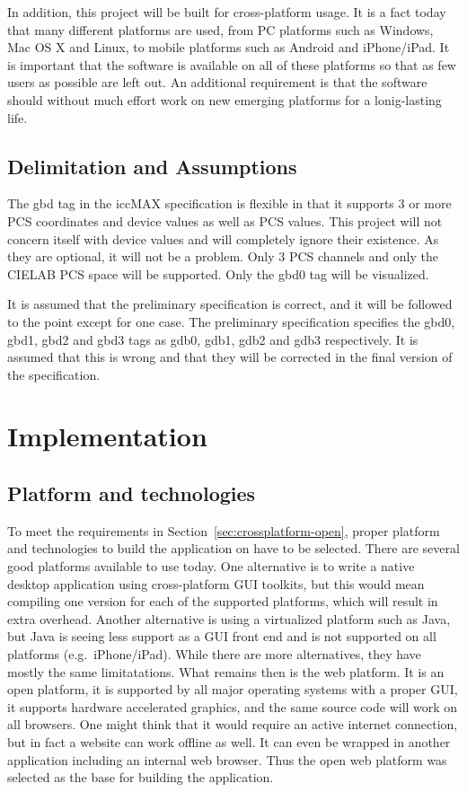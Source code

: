 In addition, this project will be built for cross-platform usage.
It is a fact today that many different platforms are used, from PC platforms such as Windows, Mac OS X and Linux, to mobile platforms such as Android and iPhone/iPad.
It is important that the software is available on all of these platforms so that as few users as possible are left out.
An additional requirement is that the software should without much effort work on new emerging platforms for a lonig-lasting life.

\subsection{Delimitation and Assumptions}
The gbd tag in the iccMAX specification is flexible in that it supports 3 or more PCS coordinates and device values as well as PCS values.
This project will not concern itself with device values and will completely ignore their existence.
As they are optional, it will not be a problem.
Only 3 PCS channels and only the CIELAB PCS space will be supported.
Only the gbd0 tag will be visualized.

It is assumed that the preliminary specification is correct, and it will be followed to the point except for one case.
The preliminary specification specifies the gbd0, gbd1, gbd2 and gbd3 tags as gdb0, gdb1, gdb2 and gdb3 respectively.
It is assumed that this is wrong and that they will be corrected in the final version of the specification.

\section{Implementation}

\subsection{Platform and technologies}
To meet the requirements in Section~\ref{sec:crossplatform-open}, proper platform and technologies to build the application on have to be selected.
There are several good platforms available to use today.
One alternative is to write a native desktop application using cross-platform GUI toolkits, but this would mean compiling one version for each of the supported platforms, which will result in extra overhead.
Another alternative is using a virtualized platform such as Java, but Java is seeing less support as a GUI front end and is not supported on all platforms (e.g.\ iPhone/iPad).
While there are more alternatives, they have mostly the same limitatations.
What remains then is the web platform.
It is an open platform, it is supported by all major operating systems with a proper GUI, it supports hardware accelerated graphics, and the same source code will work on all browsers.
One might think that it would require an active internet connection, but in fact a website can work offline as well.
It can even be wrapped in another application including an internal web browser.
Thus the open web platform was selected as the base for building the application.

